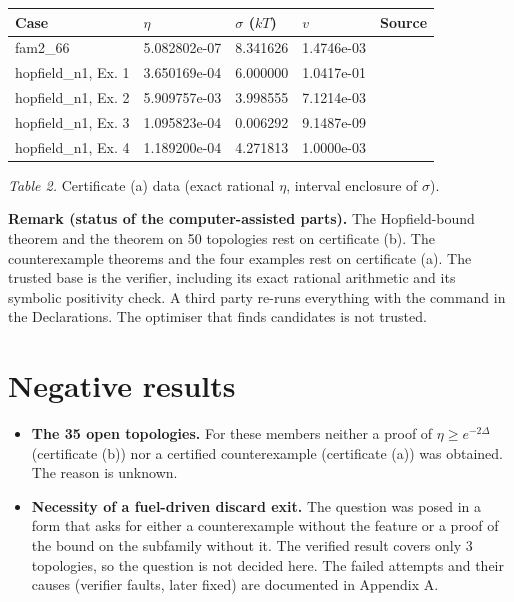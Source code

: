 \documentclass[11pt]{article}
\providecommand{\tightlist}{\setlength{\itemsep}{0pt}\setlength{\parskip}{0pt}}
\theoremstyle{definition}\newtheorem{definition}[theorem]{Definition}\newtheorem{example}[theorem]{Example}
\begin{document}
{\def\LTcaptype{none} %
\begin{longtable}[]{@{}lllll@{}}
\toprule\noalign{}
Case & \(\eta\) & \(\sigma\) (\(kT\)) & \(v\) & Source \\
\midrule\noalign{}
\endhead
\bottomrule\noalign{}
\endlastfoot
fam2\_66 & 5.082802e-07 & 8.341626 & 1.4746e-03 & \\
hopfield\_n1, Ex. 1 & 3.650169e-04 & 6.000000 & 1.0417e-01 & \\
hopfield\_n1, Ex. 2 & 5.909757e-03 & 3.998555 & 7.1214e-03 & \\
hopfield\_n1, Ex. 3 & 1.095823e-04 & 0.006292 & 9.1487e-09 & \\
hopfield\_n1, Ex. 4 & 1.189200e-04 & 4.271813 & 1.0000e-03 & \\
\end{longtable}
}

\emph{Table 2.} Certificate (a) data (exact rational \(\eta\), interval enclosure of \(\sigma\)).

\textbf{Remark (status of the computer-assisted parts).} The Hopfield-bound theorem and the theorem on 50 topologies rest on certificate (b). The counterexample theorems and the four examples rest on certificate (a). The trusted base is the verifier, including its exact rational arithmetic and its symbolic positivity check. A third party re-runs everything with the command in the Declarations. The optimiser that finds candidates is not trusted.

\section{Negative results}\label{negative-results}

\begin{itemize}
\tightlist
\item
  \textbf{The 35 open topologies.} For these members neither a proof of \(\eta\ge e^{-2\Delta}\) (certificate (b)) nor a certified counterexample (certificate (a)) was obtained. The reason is unknown.
\item
  \textbf{Necessity of a fuel-driven discard exit.} The question was posed in a form that asks for either a counterexample without the feature or a proof of the bound on the subfamily without it. The verified result covers only 3 topologies, so the question is not decided here. The failed attempts and their causes (verifier faults, later fixed) are documented in Appendix A.
\end{itemize}
\end{document}

